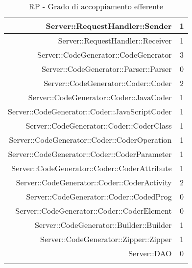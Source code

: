\documentclass[../PianoDiQualifica.tex]{subfiles}
\begin{document}
\begin{longtable}{|r|c|}
				Server::RequestHandler::Sender & 1 \\ \hline
				Server::RequestHandler::Receiver & 1 \\ \hline
				Server::CodeGenerator::CodeGenerator & 3 \\ \hline
				Server::CodeGenerator::Parser::Parser & 0 \\ \hline
				Server::CodeGenerator::Coder::Coder & 2 \\ \hline
				Server::CodeGenerator::Coder::JavaCoder & 1\\ \hline
				Server::CodeGenerator::Coder::JavaScriptCoder & 1\\ \hline
				Server::CodeGenerator::Coder::CoderClass & 1\\ \hline
				Server::CodeGenerator::Coder::CoderOperation & 1\\ \hline
				Server::CodeGenerator::Coder::CoderParameter & 1\\ \hline
				Server::CodeGenerator::Coder::CoderAttribute & 1\\ \hline
				Server::CodeGenerator::Coder::CoderActivity & 2\\ \hline
				Server::CodeGenerator::Coder::CodedProg & 0\\ \hline
				Server::CodeGenerator::Coder::CoderElement & 0\\ \hline
				Server::CodeGenerator::Builder::Builder & 1 \\ \hline
				Server::CodeGenerator::Zipper::Zipper & 1 \\ \hline
				Server::DAO & 0 \\ \hline
				\caption{RP - Grado di accoppiamento efferente}
			\end{longtable}
\end{document}
